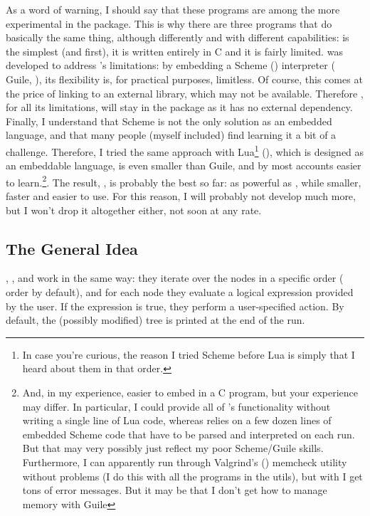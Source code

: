 As a word of warning, I should say that these programs are among the more
experimental in the \nutils{} package. This is why there are three programs
that do basically the same thing, although differently and with different
capabilities: \ed{} is the simplest (and first), it is written entirely in C
and it is fairly limited. \sched{} was developed to address \ed{}'s
limitations: by embedding a Scheme () interpreter (\gnu{}
Guile, ), its flexibility is, for practical purposes,
limitless. Of course, this comes at the price of linking to an external
library, which may not be available. Therefore \ed{}, for all its limitations,
will stay in the package as it has no external dependency. Finally, I
understand that Scheme is not the only solution as an embedded language, and
that many people (myself included) find learning it a bit of a challenge.
Therefore, I tried the same approach with Lua\footnote{In case you're curious,
the reason I tried Scheme before Lua is simply that I heard about them in that
order.} (), which is designed as an embeddable language, is even
smaller than Guile, and by most accounts easier to learn.\footnote{And, in my
experience, easier to embed in a C program, but your experience may differ. In
particular, I could provide all of \luaed's functionality without writing a
single line of Lua code, whereas \sched{} relies on a few dozen lines of
embedded Scheme code that have to be parsed and interpreted on each run. But
that may very possibly just reflect my poor Scheme/Guile skills. Furthermore, I
can apparently run \luaed{} through Valgrind's ()
memcheck utility without problems (I do this with all the programs in the
utils), but with \sched{} I get tons of error messages. But it may be that I
don't get how to manage memory with Guile}. The result, \luaed, is probably the
best so far: as powerful as \sched, while smaller, faster and easier to use.
For this reason, I will probably not develop \sched{} much more, but I won't
drop it altogether either, not soon at any rate. 

\subsection{The General Idea}

\ed, \sched, and \luaed{} work in the same way: they iterate over the nodes in a
specific order (\nw{} order by default), and for each node they evaluate a
logical expression provided by the user. If the expression is true, they perform
a user-specified action.  By default, the (possibly modified) tree is printed at
the end of the run.  

